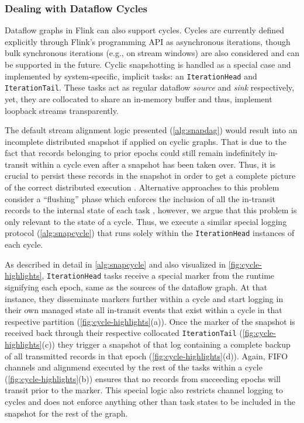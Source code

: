\subsubsection{Dealing with Dataflow Cycles}

Dataflow graphs in Flink can also support cycles. Cycles are currently defined explicitly through Flink's programming API as asynchronous iterations, though bulk synchronous iterations (e.g., on stream windows) are also considered and can be supported in the future. Cyclic snapshotting is handled as a special case and implemented by system-specific, implicit tasks: an \texttt{IterationHead} and \texttt{IterationTail}. These tasks act as regular dataflow \emph{source} and \emph{sink} respectively, yet, they are collocated to share an in-memory buffer and thus, implement loopback streams transparently.

The default stream alignment logic presented (\autoref{alg:snapdag}) would result into an incomplete distributed snapshot if applied on cyclic graphs. That is due to the fact that records belonging to prior epochs could still remain indefinitely in-transit within a cycle even after a snapshot has been taken over. Thus, it is crucial to persist these records in the snapshot in order to get a complete picture of the correct distributed execution \cite{chandy1985distributed,elnozahy2002survey}. Alternative approaches to this problem consider a ``flushing'' phase which enforces the inclusion of all the in-transit records to the internal state of each task \cite{jacques2016consistent}, however, we argue that this problem is only relevant to the state of a cycle. Thus, we execute a similar special logging protocol (\autoref{alg:snapcycle}) that runs solely within the \texttt{IterationHead} instances of each cycle.


As described in detail in \autoref{alg:snapcycle} and also visualized in \autoref{fig:cycle-highlights}, \texttt{IterationHead} tasks receive a special marker from the runtime signifying each epoch, same as the sources of the dataflow graph. At that instance, they disseminate markers further within a cycle and start logging in their own managed state all in-transit events that exist within a cycle in that respective partition (\autoref{fig:cycle-highlights}(a)). Once the marker of the snapshot is received back through their respective collocated \texttt{IterationTail} (\autoref{fig:cycle-highlights}(c)) they trigger a snapshot of that log containing a complete backup of all transmitted records in that epoch (\autoref{fig:cycle-highlights}(d)). Again, FIFO channels and alignmend executed by the rest of the tasks within a cycle (\autoref{fig:cycle-highlights}(b)) ensures that no records from succeeding epochs will transit prior to the marker. This special logic also restricts channel logging to cycles and does not enforce anything other than task states to be included in the snapshot for the rest of the  graph.

